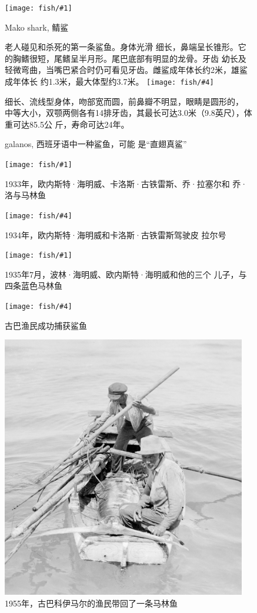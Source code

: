 \documentclass[fontset=ubuntu,zihao=-4]{ctexart}
\newcommand{\dingphotoh}[6] {
  \begin{figure}[htbp!]
    \centering
    \texttt{[image: fish/\#1]}
    \caption{#2}\label{fig:#1}
    \raggedright\small #3
    \vfill \vspace{1cm}
    \centering
    \texttt{[image: fish/\#4]}
    \caption{#5}\label{fig:#4}
    \raggedright\small #6
  \end{figure}
  \clearpage
}
\begin{document}
\dingphotoh{Makoshark}{Mako shark, 鲭鲨}{老人碰见和杀死的第一条鲨鱼。身体光滑
  细长，鼻端呈长锥形。它的胸鳍很短，尾鳍呈半月形。尾巴底部有明显的龙骨。牙齿
  幼长及轻微弯曲，当嘴巴紧合时仍可看见牙齿。雌鲨成年体长约2米，雄鲨成年体长
  约1.3米，最大体型约3.7米。 }{galanos}{galanos, 西班牙语中一种鲨鱼，可能
  是“直翅真鲨”}{细长、流线型身体，吻部宽而圆，前鼻瓣不明显，眼睛是圆形的，
  中等大小，双颚两侧各有14排牙齿，其最长可达3.0米（9.8英尺），体重可达85.5公
  斤，寿命可达24年。}

\dingphotoh{heming1}{1933年，欧内斯特·海明威、卡洛斯·古铁雷斯、乔·拉塞尔和
  乔·洛与马林鱼}{}{heming2}{1934年，欧内斯特·海明威和卡洛斯·古铁雷斯驾驶皮
  拉尔号}{}

\dingphotoh{heming3}{1935年7月，波林·海明威、欧内斯特·海明威和他的三个
  儿子，与四条蓝色马林鱼}{}{heming4}{古巴渔民成功捕获鲨鱼}{}

\begin{figure}[ht!]
  \centering
  \includegraphics[width=0.95\textwidth]{fish/heming5.jpg} \caption{\label{fig:heming5}1955年，古巴科伊马尔的渔民带回了一条马林鱼}
\end{figure}

\clearpage
\restoregeometry



\printunsrtglossary[style={mcolindexgroup },title={Glossary 词汇表}]
\end{document}
